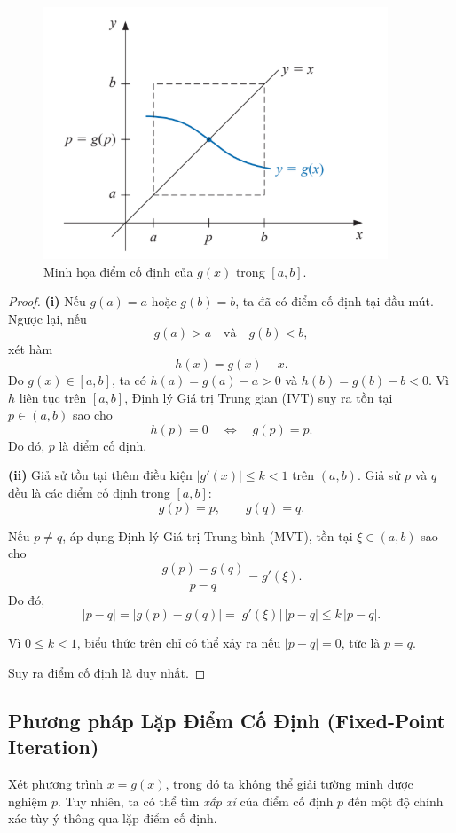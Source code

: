 \begin{figure}[!h]
\centering
\includegraphics[width=0.6\linewidth]{figures/fixed_point_diagram_placeholder.png}
\caption{Minh họa điểm cố định của $g(x)$ trong $[a,b]$.}
\label{fig:fixed_point_figure}
\end{figure}

\begin{proof}

\textbf{(i)} Nếu $g(a) = a$ hoặc $g(b) = b$, ta đã có điểm cố định tại đầu mút.
Ngược lại, nếu
\[
g(a) > a \quad \text{và} \quad g(b) < b,
\]
xét hàm
\[
h(x) = g(x) - x.
\]
Do $g(x) \in [a,b]$, ta có $h(a) = g(a) - a > 0$ và $h(b) = g(b) - b < 0$.
Vì $h$ liên tục trên $[a,b]$, Định lý Giá trị Trung gian (IVT) suy ra tồn tại $p \in (a,b)$ sao cho
\[
h(p) = 0 \quad \Longleftrightarrow \quad g(p) = p.
\]
Do đó, $p$ là điểm cố định.

\bigskip
\textbf{(ii)} Giả sử tồn tại thêm điều kiện $|g'(x)| \le k < 1$ trên $(a,b)$.
Giả sử $p$ và $q$ đều là các điểm cố định trong $[a,b]$:
\[
g(p) = p, \qquad g(q) = q.
\]

Nếu $p \neq q$, áp dụng Định lý Giá trị Trung bình (MVT), tồn tại $\xi \in (a,b)$ sao cho
\[
\frac{g(p) - g(q)}{p - q} = g'(\xi).
\]
Do đó,
\[
|p - q|
= |g(p) - g(q)|
= |g'(\xi)|\,|p - q|
\le k\,|p - q|.
\]

Vì $0 \le k < 1$, biểu thức trên chỉ có thể xảy ra nếu $|p - q| = 0$, tức là $p=q$.

Suy ra điểm cố định là duy nhất.

\end{proof}

\subsection{Phương pháp Lặp Điểm Cố Định (Fixed-Point Iteration)}
\label{subsec:fixed_point_iteration}

Xét phương trình $x = g(x)$, trong đó ta không thể giải tường minh được nghiệm $p$.
Tuy nhiên, ta có thể tìm \emph{xấp xỉ} của điểm cố định $p$ đến một độ chính xác tùy ý
thông qua lặp điểm cố định.


